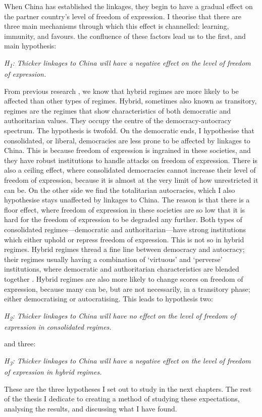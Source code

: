 When China has established the linkages, they begin to have a gradual effect on the partner country's level of freedom of expression. I theorise that there are three main mechanisms through which this effect is channelled: learning, immunity, and favours. the confluence of these factors lead us to the first, and main hypothesis:
\begin{displayquote}
    \textit{H\textsubscript{1}: Thicker linkages to China will have a negative effect on the level of freedom of expression.}  
\end{displayquote}
From previous research \citep{toettoe_foreign_2023}, we know that hybrid regimes are more likely to be affected than other types of regimes. Hybrid, sometimes also known as transitory, regimes are the regimes that show characteristics of both democratic and authoritarian values.  They occupy the centre of the democracy-autocracy spectrum. The hypothesis is twofold. On the democratic ends, I hypothesise that consolidated, or liberal, democracies are less prone to be affected by linkages to China. This is because freedom of expression is ingrained in these societies, and they have robust institutions to handle attacks on freedom of expression. There is also a ceiling effect, where consolidated democracies cannot increase their level of freedom of expression, because it is almost at the very limit of how unrestricted it can be. On the other side we find the totalitarian autocracies, which I also hypothesise stays unaffected by linkages to China. The reason is that there is a floor effect, where freedom of expression in these societies are so low that it is hard for the freedom of expression to be degraded any further. Both types of consolidated regimes---democratic and authoritarian---have strong institutions which either uphold or repress freedom of expression. This is not so in hybrid regimes. Hybrid regimes thread a fine line between democracy and autocracy; their regimes usually having a combination of `virtuous' and `perverse' institutions, where democratic and authoritarian characteristics are blended together \citep{valenzuela_democratic_1990}. Hybrid regimes are also more likely to change scores on freedom of expression, because many can be, but are not necessarily, in a transitory phase; either democratising or autocratising.  This leads to hypothesis two:
\begin{displayquote}
    \textit{H\textsubscript{2}: Thicker linkages to China will have no effect on the level of freedom of expression in consolidated regimes.}
\end{displayquote}
and three:
\begin{displayquote}
    \textit{H\textsubscript{3}: Thicker linkages to China will have a negative effect on the level of freedom of expression in hybrid regimes.}
\end{displayquote}

These are the three hypotheses I set out to study in the next chapters. The rest of the thesis I dedicate to creating a method of studying these expectations, analysing the results, and discussing what I have found. 